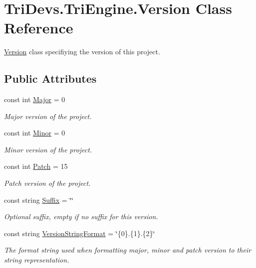 \hypertarget{class_tri_devs_1_1_tri_engine_1_1_version}{\section{Tri\-Devs.\-Tri\-Engine.\-Version Class Reference}
\label{class_tri_devs_1_1_tri_engine_1_1_version}
}


\hyperlink{class_tri_devs_1_1_tri_engine_1_1_version}{Version} class specifiying the version of this project.  


\subsection*{Public Attributes}
\begin{DoxyCompactItemize}
\item 
const int \hyperlink{class_tri_devs_1_1_tri_engine_1_1_version_a84694bfde22fdb60202999d7fa6fa27e}{Major} = 0
\begin{DoxyCompactList}\small\item\em Major version of the project. \end{DoxyCompactList}\item 
const int \hyperlink{class_tri_devs_1_1_tri_engine_1_1_version_ab7c39e50eec0bad0d6d09f64232081b5}{Minor} = 0
\begin{DoxyCompactList}\small\item\em Minor version of the project. \end{DoxyCompactList}\item 
const int \hyperlink{class_tri_devs_1_1_tri_engine_1_1_version_a6dd7b2fc481a9e97df515538348ed9e8}{Patch} = 15
\begin{DoxyCompactList}\small\item\em Patch version of the project. \end{DoxyCompactList}\item 
const string \hyperlink{class_tri_devs_1_1_tri_engine_1_1_version_a491a3f8d4f35c7a5b31331332a32381f}{Suffix} = \char`\"{}\char`\"{}
\begin{DoxyCompactList}\small\item\em Optional suffix, empty if no suffix for this version. \end{DoxyCompactList}\item 
const string \hyperlink{class_tri_devs_1_1_tri_engine_1_1_version_adf5664e5d5b902a24c6f14b195dd6530}{Version\-String\-Format} = \char`\"{}\{0\}.\{1\}.\{2\}\char`\"{}
\begin{DoxyCompactList}\small\item\em The format string used when formatting major, minor and patch version to their string representation. \end{DoxyCompactList}\item 

\end{DoxyCompactItemize}
